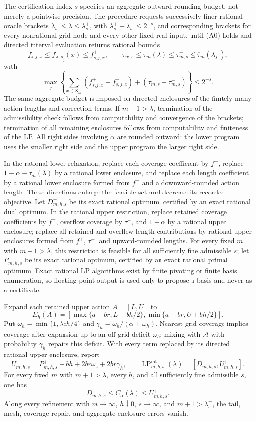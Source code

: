 The certification index \(s\) specifies an aggregate outward-rounding
budget, not merely a pointwise precision.  The procedure requests
successively finer rational oracle brackets
\(\lambda_s^-\le\lambda\le\lambda_s^+\), with
\(\lambda_s^+-\lambda_s^-\le2^{-s}\), and corresponding brackets for
every nonrational grid node and every other fixed real input, until
(A0) holds and directed interval evaluation returns rational bounds
\[
 f_{s,j,x}^-\le f_{\lambda,\rho_j}(x)\le f_{s,j,x}^+,
 \qquad
 \tau_{m,s}^-\le\tau_m(\lambda)\le\tau_{m,s}^+
 \le\overline\tau_m(\lambda_s^+),
\]
with
\[
 \max_j\left\{
 \sum_{x\in\mathsf X_m}(f_{s,j,x}^+-f_{s,j,x}^-)
 +(\tau_{m,s}^+-\tau_{m,s}^-)
 \right\}\le2^{-s}.
 \tag{A2}
\]
The same aggregate budget is imposed on directed enclosures of the
finitely many action lengths and correction terms.  If
\(m+1>\lambda\), termination of the admissibility check follows from
computability and convergence of the brackets; termination of all
remaining enclosures follows from computability and finiteness of the
LP.  All right sides involving \(\alpha\) are rounded outward: the
lower program uses the smaller right side and the upper program the
larger right side.

In the rational lower relaxation, replace each coverage coefficient by
\(f^+\), replace \(1-\alpha-\tau_m(\lambda)\) by a rational lower
enclosure, and replace each length coefficient by a rational lower
enclosure formed from \(f^-\) and a downward-rounded action length.
These directions enlarge the feasible set and decrease its recorded
objective.  Let \(D_{m,h,s}^-\) be its exact rational optimum, certified
by an exact rational dual optimum.  In the rational upper restriction,
replace retained coverage coefficients by \(f^-\), overflow coverage
by \(\tau^-\), and \(1-\alpha\) by a rational upper enclosure; replace
all retained and overflow length contributions by rational upper
enclosures formed from \(f^+\), \(\tau^+\), and upward-rounded
lengths.  For every fixed \(m\) with \(m+1>\lambda\), this restriction
is feasible for all sufficiently fine admissible \(s\); let
\(P_{m,h,s}^+\) be its exact rational optimum, certified by an exact
rational primal optimum.  Exact rational LP algorithms exist by finite
pivoting or finite basis enumeration, so floating-point output is used
only to propose a basis and never as a certificate.

Expand each retained upper action \(A=[L,U]\) to
\[
 E_h(A)=[\max\{a-br,L-bh/2\},\min\{a+br,U+bh/2\}].
\]
Put \(\omega_h=\min\{1,\lambda ch/4\}\) and
\(\gamma_h=\omega_h/(\alpha+\omega_h)\).  Nearest-grid coverage
implies coverage after expansion up to an off-grid deficit
\(\omega_h\); mixing with \(\mathcal A\) with probability
\(\gamma_h\) repairs this deficit.  With every term replaced by its
directed rational upper enclosure, report
\[
 U_{m,h,s}^+=P_{m,h,s}^++bh+2br\omega_h+2br\gamma_h,
 \qquad
 \operatorname{LP}_{m,h,s}^{\mathrm{int}}(\lambda)
 =[D_{m,h,s}^-,U_{m,h,s}^+].
\]
For every fixed \(m\) with \(m+1>\lambda\), every \(h\), and all
sufficiently fine admissible \(s\), one has
\[
 D_{m,h,s}^-\le C_\alpha(\lambda)\le U_{m,h,s}^+.
\]
Along every refinement with \(m\to\infty\), \(h\downarrow0\),
\(s\to\infty\), and \(m+1>\lambda_s^+\), the tail, mesh,
coverage-repair, and aggregate enclosure errors vanish.

